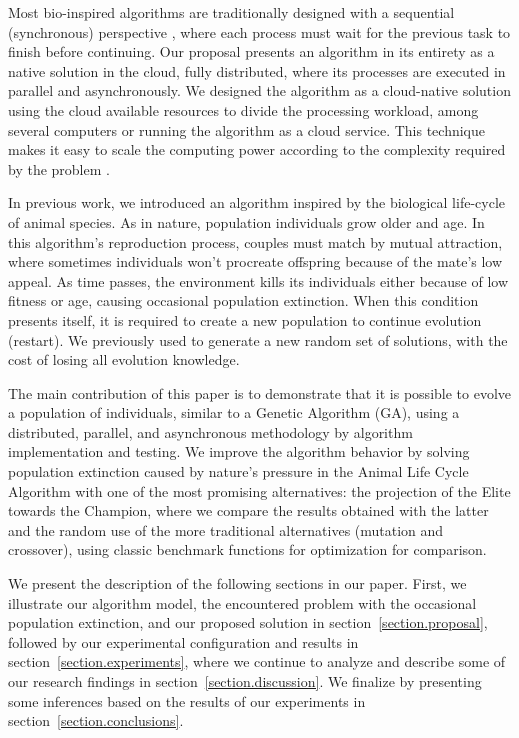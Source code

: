 \documentclass[graybox]{svmult}
\begin{document}
    Most bio-inspired algorithms are traditionally designed with a sequential
    (synchronous) perspective \cite{porto2018evolutionary,back1996evolutionary},
    where each process must wait for the previous task to finish before continuing.
    Our proposal presents an algorithm in its entirety as a native solution in the
    cloud, fully distributed, where its processes are executed in parallel and
    asynchronously. We designed the algorithm as a cloud-native solution using the
    cloud available resources to divide the processing workload, among several
    computers or running the algorithm as a cloud service. This technique makes it
    easy to scale the computing power according to the complexity required by the
    problem \cite{armbrust2010view}.

    In previous work, we introduced an algorithm inspired by the biological
    life-cycle of animal species. As in nature, population individuals grow older
    and age. In this algorithm's reproduction process, couples must match by mutual
    attraction, where sometimes individuals won't procreate offspring because of
    the mate's low appeal. As time passes, the environment kills its individuals
    either because of low fitness or age, causing occasional population extinction.
    When this condition presents itself, it is required to create a new population
    to continue evolution (restart). We previously used to generate a new random
    set of solutions, with the cost of losing all evolution knowledge.

    The main contribution of this paper is to demonstrate that it is possible to
    evolve a population of individuals, similar to a Genetic Algorithm (GA), using
    a distributed, parallel, and asynchronous methodology by algorithm
    implementation and testing. We improve the algorithm behavior by solving
    population extinction caused by nature's pressure in the Animal Life Cycle
    Algorithm with one of the most promising alternatives: the projection of the
    Elite towards the Champion, where we compare the results obtained with the
    latter and the random use of the more traditional alternatives (mutation and
    crossover), using classic benchmark functions for optimization for comparison.

    We present the description of the following sections in our paper. First, we
    illustrate our algorithm model, the encountered problem with the occasional
    population extinction, and our proposed solution in
    section~\ref{section.proposal}, followed by our experimental configuration and
    results in section~\ref{section.experiments}, where we continue to analyze and
    describe some of our research findings in section~\ref{section.discussion}. We
    finalize by presenting some inferences based on the results of our experiments
    in section~\ref{section.conclusions}.
\end{document}
